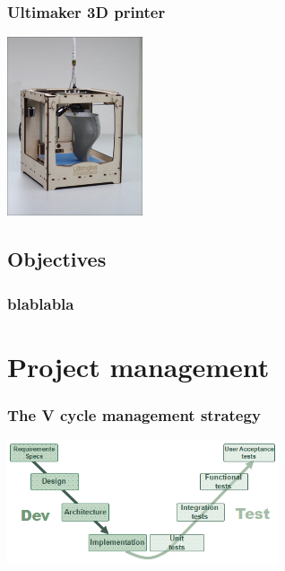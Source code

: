 \documentclass{beamer}
\begin{document}
\begin{frame}
	\frametitle{Ultimaker 3D printer}

    \begin{center}
		\includegraphics[width=4cm]{Ultimaker}	
	\end{center}
    
\end{frame}

\subsection{Objectives}
\begin{frame}
	\frametitle{blablabla}
    
\end{frame}

\section{Project management}
\begin{frame}
	\frametitle{The V cycle management strategy}

    \begin{center}
		\includegraphics[width=8cm]{VCycle}	
	\end{center}
\end{frame}
\end{document}
